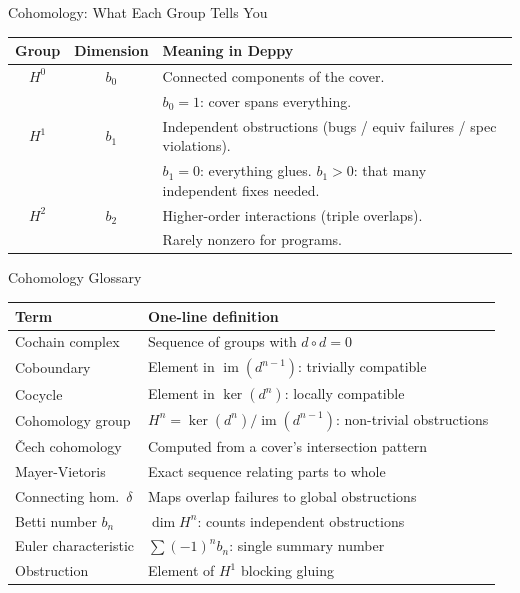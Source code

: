 \documentclass[aspectratio=169,10pt]{beamer}
\newcommand{\im}{\operatorname{im}}
\begin{document}
\begin{frame}{Cohomology: What Each Group Tells You}
\begin{center}
\renewcommand{\arraystretch}{1.5}
\begin{tabular}{@{}ccp{6cm}@{}}
\toprule
\textbf{Group} & \textbf{Dimension} & \textbf{Meaning in Deppy} \\
\midrule
$H^0$ & $b_0$ & Connected components of the cover. \\
& & $b_0 = 1$: cover spans everything. \\
\midrule
$H^1$ & $b_1$ & Independent obstructions (bugs / equiv failures / spec violations). \\
& & $b_1 = 0$: everything glues. $b_1 > 0$: that many independent fixes needed. \\
\midrule
$H^2$ & $b_2$ & Higher-order interactions (triple overlaps). \\
& & Rarely nonzero for programs. \\
\bottomrule
\end{tabular}
\end{center}
\end{frame}

\begin{frame}{Cohomology Glossary}
\footnotesize
\renewcommand{\arraystretch}{1.2}
\begin{tabular}{@{}lp{8.5cm}@{}}
\toprule
\textbf{Term} & \textbf{One-line definition} \\
\midrule
Cochain complex & Sequence of groups with $d \circ d = 0$ \\
Coboundary & Element in $\im(d^{n-1})$: trivially compatible \\
Cocycle & Element in $\ker(d^n)$: locally compatible \\
Cohomology group & $H^n = \ker(d^n)/\im(d^{n-1})$: non-trivial obstructions \\
\v{C}ech cohomology & Computed from a cover's intersection pattern \\
Mayer-Vietoris & Exact sequence relating parts to whole \\
Connecting hom.\ $\delta$ & Maps overlap failures to global obstructions \\
Betti number $b_n$ & $\dim H^n$: counts independent obstructions \\
Euler characteristic & $\sum (-1)^n b_n$: single summary number \\
Obstruction & Element of $H^1$ blocking gluing \\
\bottomrule
\end{tabular}
\end{frame}
\end{document}
